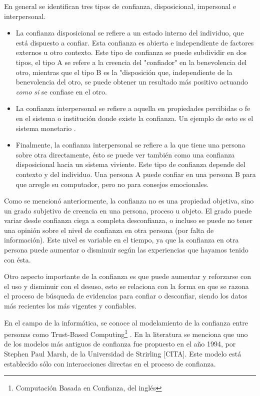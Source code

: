 En general se identifican tres tipos de confianza, disposicional, impersonal e interpersonal. 

\begin{itemize}
\item{La confianza disposicional se refiere a un estado interno del individuo, que está dispuesto a confiar. Esta confianza es abierta e independiente de factores externos u otro contexto. Este tipo de confianza se puede subdividir en dos tipos, el tipo A se refere a la creencia del "confiador" en la benevolencia del otro, mientras que el tipo B es la "disposición que, independiente de la benevolencia del otro, se puede obtener un resultado más positivo actuando \textit{como si} se confiase en el otro. \cite{Marsh1994}}



\item{La confianza interpersonal se refiere a aquella en propiedades percibidas o fe en el sistema o institución donde existe la confianza. Un ejemplo de esto es el sistema monetario \cite{Medic2012}.}

\item{Finalmente, la confianza interpersonal se refiere a la que tiene una persona sobre otra directamente, ésto se puede ver también como una confianza disposicional hacia un sistema viviente. Este tipo de confianza depende del contexto y del individuo. Una persona A puede confiar en una persona B para que arregle su computador, pero no para consejos emocionales.}
\end{itemize}
Como se mencionó anteriormente, la confianza no es una propiedad objetiva, sino un grado subjetivo de creencia en una persona, proceso u objeto. El grado puede variar desde confianza ciega a completa desconfianza, o incluso se puede no tener una opinión sobre el nivel de confianza en otra persona (por falta de información). Este nivel es variable en el tiempo, ya que la confianza en otra persona puede aumentar o disminuir según las experiencias que hayamos tenido con ésta. 

Otro aspecto importante de la confianza es que puede aumentar y reforzarse con el uso y disminuir con el desuso, esto se relaciona con la forma en que se razona el proceso de búsqueda de evidencias  para confiar o desconfiar, siendo los datos más recientes los más vigentes y confiables.  \cite{Medic2012}

En el campo de la informática, se conoce al modelamiento de la confianza entre personas como Trust-Based Computing\footnote{ Computación Basada en Confianza, del inglés} \cite{Victor}.
En la literatura \cite{Medic2012,Victor,Artz2007} se menciona que uno de los modelos más antiguos de confianza fue propuesto en el año 1994, por Stephen Paul Marsh, de la Universidad de Strirling [CITA]. Este modelo está establecido sólo con interacciones directas en el proceso de confianza. 

